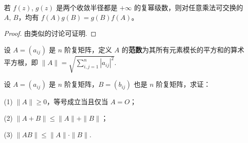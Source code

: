 \documentclass[../../main.tex]{subfiles}
\begin{document}
\begin{corollary}\label{corollary:矩阵幂级数乘法可交换}
若 $f(z)$, $g(z)$ 是两个收敛半径都是 $+\infty$ 的复幂级数，则对任意乘法可交换的 $A$, $B$，均有 $f(A)g(B)=g(B)f(A)$。 
\end{corollary}
\begin{proof}
由类似的讨论可证明.
\end{proof}

\begin{definition}[矩阵的范数]\label{definition:矩阵的范数}
设 $A=(a_{ij})$ 是 $n$ 阶复矩阵，定义 $A$ 的\textbf{范数}为其所有元素模长的平方和的算术平方根，即 $\|A\| = \sqrt{\sum_{i,j = 1}^{n}|a_{ij}|^2}$.
\end{definition}

\begin{proposition}[矩阵的范数的基本性质]\label{proposition:矩阵的范数的基本性质}
设 $A=(a_{ij})$ 是 $n$ 阶复矩阵，$B=(b_{ij})$ 也是 $n$ 阶复矩阵，求证：

(1) $\|A\|\geq 0$，等号成立当且仅当 $A = O$；

(2) $\|A + B\|\leq \|A\| + \|B\|$；

(3) $\|AB\|\leq \|A\|\cdot\|B\|$.
\end{proposition}
\end{document}
